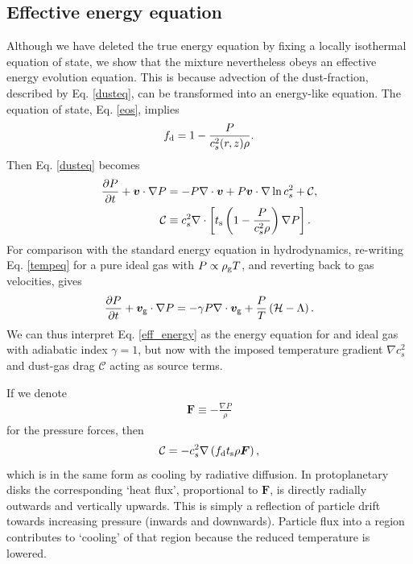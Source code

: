 \subsection{Effective energy equation}\label{energy_analogy}
Although we have deleted the true energy
equation by fixing a locally isothermal
equation of state, we show that the mixture 
nevertheless obeys an effective energy evolution equation. This is
because advection of the dust-fraction, described by
Eq. \ref{dusteq}, can be transformed into an energy-like 
equation.  
The equation of state, Eq. \ref{eos}, implies 
\begin{align*}
  f_\mathrm{d} = 1 - \frac{P}{c_s^2(r,z)\rho}.  
\end{align*}
Then Eq. \ref{dusteq} becomes
\begin{align}
\frac{\partial P}{\partial t} + \bm{v}\cdot\nabla P  
&= - P \nabla\cdot\bm{v} + P\bm{v}\cdot\nabla\ln{c_s^2}
                + \mathcal{C},  \label{eff_energy} \\
\mathcal{C}&\equiv c_s^2 \nabla\cdot\left[t_\mathrm{s}\left(1 -
  \frac{P}{c_s^2\rho}\right)\nabla 
  P\right].
\end{align} 
For comparison with the standard energy equation in hydrodynamics,
re-writing Eq. \ref{tempeq} for a pure ideal gas with $P \propto
\rho_\mathrm{g} T$, and reverting back to gas velocities, gives  
\begin{align}
  \frac{\partial P}{\partial t} + \bm{v}_\mathrm{g}\cdot\nabla P = - \gamma P
  \nabla\cdot \bm{v}_\mathrm{g}  +
  \frac{P}{T}\left(\mathcal{H} -
    \Lambda\right).\label{real_pressure} 
\end{align} 
We can thus interpret Eq. \ref{eff_energy} as the energy equation for
and ideal gas with adiabatic index $\gamma=1$, but now with the
imposed temperature gradient $\nabla c_s^2$ and dust-gas drag $\mathcal{C}$ 
acting as source terms. 

   
If we denote 
\begin{align}
  \bm{F} \equiv  - \frac{\nabla P}{\rho}
\end{align}
for the pressure forces, then
\begin{align*}
  \mathcal{C} = - c_s^2\nabla \left( f_\mathrm{d} t_\mathrm{s} \rho \bm{F}
  \right), 
\end{align*}
which is in the same form as cooling by radiative diffusion. In protoplanetary
disks the corresponding `heat flux', proportional to $\bm{F}$, is
directly radially outwards and vertically upwards. This is simply a
reflection of particle drift towards increasing pressure (inwards and 
downwards). Particle flux into a region contributes to `cooling' of
that region because the reduced temperature is lowered. 

